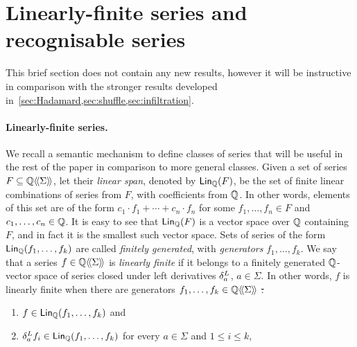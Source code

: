 \section{Linearly-finite series and recognisable series}
\label{sec:recognisable}

This brief section does not contain any new results,
however it will be instructive in comparison with the stronger results
developed in~\cref{sec:Hadamard,sec:shuffle,sec:infiltration}.
%
%

\paragraph{Linearly-finite series.}

We recall a semantic mechanism to define classes of series
that will be useful in the rest of the paper in comparison to more general classes.
%
Given a set of series $F \subseteq \mathbb Q\langle\!\langle\Sigma\rangle\!\rangle$,
let their \emph{linear span}, denoted by $\mathsf{Lin}_{\mathbb Q}(F)$,
be the set of finite linear combinations of series from $F$,
with coefficients from $\mathbb Q$.
%
In other words, elements of this set are of the form $c_1 \cdot f_1 + \cdots + c_n \cdot f_n$
for some $f_1, \dots, f_n \in F$ and $c_1, \dots, c_n \in \mathbb Q$.
%
It is easy to see that $\mathsf{Lin}_{\mathbb Q}(F)$ is a vector space over $\mathbb Q$ containing $F$,
and in fact it is the smallest such vector space.
%
Sets of series of the form $\mathsf{Lin}_{\mathbb Q}(f_1, \dots, f_k)$ are called \emph{finitely generated},
with \emph{generators} $f_1, \dots, f_k$.
%
We say that a series $f \in \mathbb Q\langle\!\langle\Sigma\rangle\!\rangle$ is \emph{linearly finite}
if it belongs to a finitely generated $\mathbb Q$-vector space of series
closed under left derivatives $\delta^L_{a}$, $a \in \Sigma$.
%
In other words, $f$ is linearly finite when there are generators $f_1, \dots, f_k \in \mathbb Q\langle\!\langle\Sigma\rangle\!\rangle$ \st:
%
\begin{enumerate}[label=\textbf{(R.\arabic*)}]
    \item \label{linearly_finite:1} $f \in \mathsf{Lin}_{\mathbb Q}(f_1, \dots, f_k)$ and
    \item \label{linearly_finite:2} $\delta^L_{a} f_i \in \mathsf{Lin}_{\mathbb Q}(f_1, \dots, f_k)$
    for every $a \in \Sigma$ and $1 \leq i \leq k$,
\end{enumerate}

